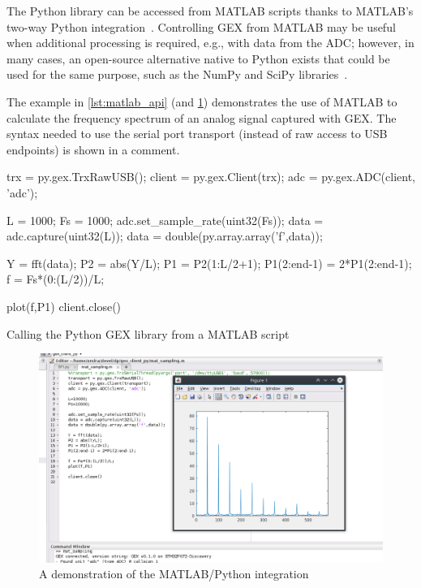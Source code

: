 The Python library can be accessed from MATLAB scripts thanks to MATLAB's two-way Python integration~\cite{matlabpy}. Controlling GEX from MATLAB may be useful when additional processing is required, e.g., with data from the \gls{ADC}; however, in many cases, an open-source alternative native to Python exists that could be used for the same purpose, such as the NumPy and SciPy libraries~\cite{numpyscipy}.

The example in \cref{lst:matlab_api} (and \cref{fig:matlabpic}) demonstrates the use of MATLAB to calculate the frequency spectrum of an analog signal captured with GEX. The syntax needed to use the serial port transport (instead of raw access to USB endpoints) is shown in a comment.

\begin{listing}
	\begin{matlabcode}
	
	trx = py.gex.TrxRawUSB();
	client = py.gex.Client(trx);
	adc = py.gex.ADC(client, 'adc');
	
	L = 1000; Fs = 1000;
	adc.set_sample_rate(uint32(Fs)); %
	data = adc.capture(uint32(L));
	data = double(py.array.array('f',data)); %
	
	Y = fft(data);
	P2 = abs(Y/L);
	P1 = P2(1:L/2+1);
	P1(2:end-1) = 2*P1(2:end-1);
	f = Fs*(0:(L/2))/L;
	
	plot(f,P1)
	client.close()
	\end{matlabcode}
	\caption{\label{lst:matlab_api} Calling the Python GEX library from a MATLAB script}
\end{listing}

\begin{figure}
	\centering
	\includegraphics[width=\textwidth]{img/matlab-fft.png}
	\caption{A demonstration of the MATLAB/Python integration}
	\label{fig:matlabpic}
\end{figure}

